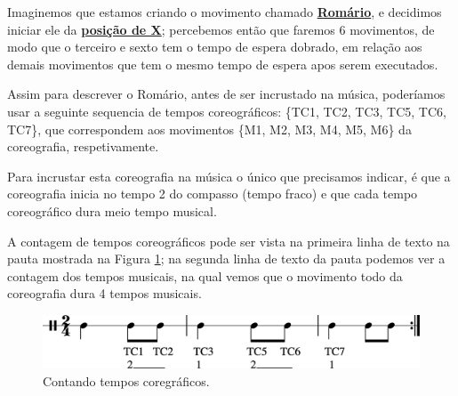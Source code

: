 \begin{example}
Imaginemos que estamos criando o movimento chamado \hyperref[subsec:passo:romario]{\textbf{Romário}},
e decidimos iniciar ele da \hyperref[def:X-position]{\textbf{posição de X}}; 
percebemos então que faremos 6 movimentos,
de modo que o terceiro e sexto tem o tempo de espera dobrado, 
em relação aos demais movimentos que tem o mesmo tempo de espera apos serem executados.

Assim para descrever o Romário, antes de ser incrustado na música, 
poderíamos usar a seguinte sequencia de tempos coreográficos: \{TC1, TC2, TC3, TC5, TC6, TC7\},
que correspondem aos movimentos \{M1, M2, M3, M4, M5, M6\} da coreografia, respetivamente.

Para incrustar esta coreografia na música o único que precisamos indicar,
é que a coreografia inicia no tempo 2 do compasso (tempo fraco)
e que cada tempo coreográfico dura meio tempo musical.

A contagem de tempos coreográficos pode ser vista na primeira linha de texto na pauta mostrada na Figura \ref{fig:contagemtempocoreografico};
na segunda linha de texto da pauta podemos ver a contagem dos tempos musicais,
na qual vemos que o movimento todo da coreografia dura 4 tempos musicais.
\end{example}

\begin{figure}[!h]
    \centering
    \includegraphics[width=\textwidth]{chapters/cap-musicalidade/abc-contagemtempocoreografico-1.eps}

    \vspace{-10pt}
    \caption{Contando tempos coregráficos.}
    \label{fig:contagemtempocoreografico}
\end{figure}

\vspace{-10pt}

